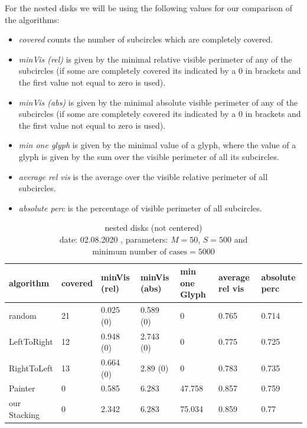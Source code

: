 \documentclass[a4paper,11pt]{article}
\begin{document}
For the nested disks we will be using the following values for our comparison of the algorithms:
\begin{itemize}
  \item \textit{covered} counts the number of subcircles which are completely covered.
  \item \textit{minVis (rel)} is given by the minimal relative visible perimeter of any of the subcircles (if some are completely covered its indicated by a 0 in brackets and the first value not equal to zero is used).
  \item \textit{minVis (abs)} is given by the minimal absolute visible perimeter of any of the subcircles (if some are completely covered its indicated by a 0 in brackets and the first value not equal to zero is used).
  \item \textit{min one glyph} is given by the minimal value of a glyph, where the value of a glyph is given by the sum over the visible perimeter of all its subcircles.
  \item \textit{average rel vis} is the average over the visible relative perimeter of all subcircles.
  \item \textit{absolute perc} is the percentage of visible perimeter of all subcircles.
\end{itemize}






\begin{table}[!h]
  \begin{center}
    \begin{tabular}{| l || p{1.3cm} | p{1.7cm} | p{1.7cm} | p{1.5cm} | p{1.5cm} | p{1.5cm} |}
      \hline
      algorithm & covered & minVis (rel) & minVis (abs) & min one Glyph & average rel vis &absolute perc\\
      \hline
      random & 21 & 0.025 (0) & 0.589 (0) & 0 & 0.765 & 0.714\\

      LeftToRight & 12 & 0.948 (0) & 2.743 (0) & 0 & 0.775 & 0.725\\

      RightToLeft & 13 & 0.664 (0) & 2.89 (0) & 0 & 0.783 & 0.735\\

      Painter & 0 & 0.585 & 6.283 & 47.758 & 0.857 & 0.759\\

      our Stacking & 0 & 2.342 & 6.283 & 75.034 & 0.859 & 0.77\\

      \hline
    \end{tabular}
  \end{center}
  \caption{nested disks (not centered)\\
  date: 02.08.2020  , parameters: $M=50$, $S=500$ and $\text{minimum number of cases}=5000$  }
\end{table}
\end{document}
